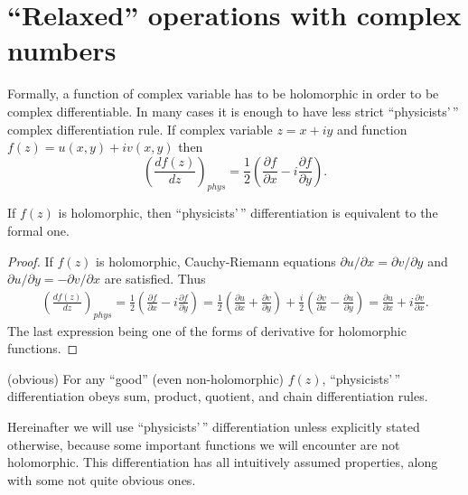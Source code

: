 \section{``Relaxed'' operations with complex numbers}

Formally, a function of complex variable has to be holomorphic in order to be complex differentiable.
In many cases it is enough to have less strict ``physicists'\,'' complex differentiation rule.
If complex variable $z = x + iy$ and function $f(z) = u(x, y) + iv(x, y)$ then
\[
	\left( \frac{df(z)}{dz} \right)_{phys}
	= \frac{1}{2} \left(
		\frac{\partial f}{\partial x} - i \frac{\partial f}{\partial y}
	\right).
\]

\begin{lemma}
If $f(z)$ is holomorphic, then ``physicists'\,'' differentiation is equivalent to the formal one.
\end{lemma}
\begin{proof}
If $f(z)$ is holomorphic, Cauchy-Riemann equations $\partial u / \partial x = \partial v / \partial y$ and $\partial u / \partial y = -\partial v / \partial x$ are satisfied.
Thus
\begin{equation*}
\begin{split}
	\left( \frac{df(z)}{dz} \right)_{phys}
	= \frac{1}{2} \left(
		\frac{\partial f}{\partial x} - i \frac{\partial f}{\partial y}
	\right)
	= \frac{1}{2} \left(
		\frac{\partial u}{\partial x} + \frac{\partial v}{\partial y}
	\right)
	+ \frac{i}{2} \left(
		\frac{\partial v}{\partial x} - \frac{\partial u}{\partial y}
	\right)
	= \frac{\partial u}{\partial x} + i \frac{\partial v}{\partial x}.
\end{split}
\end{equation*}
The last expression being one of the forms of derivative for holomorphic functions.
\end{proof}

\begin{lemma}
(obvious) For any ``good'' (even non-holomorphic) $f(z)$, ``physicists'\,'' differentiation obeys sum, product, quotient, and chain differentiation rules.
\end{lemma}

Hereinafter we will use ``physicists'\,'' differentiation unless explicitly stated otherwise,
because some important functions we will encounter are not holomorphic.
This differentiation has all intuitively assumed properties, along with some not quite obvious ones.

